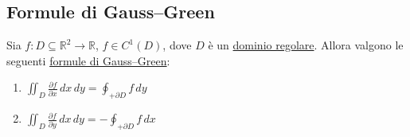 
\subsection{Formule di Gauss--Green}

\begin{theorem}
Sia $f : D \subseteq \mathbb{R}^2 \to \mathbb{R}$, $f \in C^1(D)$, dove $D$ è un \underline{dominio regolare}. Allora valgono le seguenti \underline{formule di Gauss--Green}:
\begin{enumerate}
    \item $\displaystyle \iint_D \frac{\partial f}{\partial x}\, dx\, dy = \oint_{+\partial D} f\, dy$
    \item $\displaystyle \iint_D \frac{\partial f}{\partial y}\, dx\, dy = -\oint_{+\partial D} f\, dx$
\end{enumerate}
\end{theorem}

